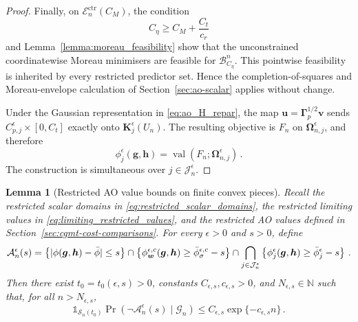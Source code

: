 \documentclass{article}
\makeatletter
\newtheorem{lemma}{Lemma}
\theoremstyle{definition}
\newcommand{\abs}[1]{%
	\ensuremath{%
		\if@display
		\left| #1 \right|
		\else
		\lvert #1 \rvert
		\fi
	}%
}
\newcommand*{\bb}{\boldsymbol}
\def\bw {\bb{w}}
\def\bu{\bb{u}}
\def\bv{\bb{v}}
\def\bh{\bb{h}}
\def\bg{\bb{g}}
\makeatother
\begin{document}
\begin{bibunit}
\begin{proof}
Finally, on $\mathcal E_n^{\mathrm{ctr}}(C_M)$, the condition
$$
    C_\eta
    \geq
    C_M+\frac{C_t}{c_r}
$$
and Lemma~\ref{lemma:moreau_feasibility} show that the unconstrained
coordinatewise Moreau minimisers are feasible for
$\mathcal B^n_{C_\eta}$. This pointwise feasibility is inherited by every
restricted predictor set. Hence the completion-of-squares and
Moreau-envelope calculation of Section~\ref{sec:ao-scalar} applies without
change.

Under the Gaussian representation in \eqref{eq:ao_H_repar}, the map
$\bu=\bb\Gamma_p^{1/2}\bv$ sends
$C_{p,j}^\epsilon\times[0,C_t]$ exactly onto
$\bb K_j^\epsilon(U_n)$. The resulting objective is $F_n$ on
$\bb\Omega_{n,j}^\epsilon$, and therefore
$$
    \phi_j^\epsilon(\bg,\bh)
    =
    \operatorname{val}
    \left(
        F_n;
        \bb\Omega_{n,j}^\epsilon
    \right)\,.
$$
The construction is simultaneous over $j\in\mathcal J_n^\epsilon$.
\end{proof}

\begin{lemma}[Restricted AO value bounds on finite convex pieces]
\label{lemma:restricted_AO_value_bounds}
Recall the restricted scalar domains in
\eqref{eq:restricted_scalar_domains}, the restricted limiting values in
\eqref{eq:limiting_restricted_values}, and the restricted AO values defined
in Section~\ref{sec:cgmt-cost-comparisons}. For every $\epsilon>0$ and
$s>0$, define
$$
\begin{aligned}
    \mathcal A_n^{\epsilon}(s)
    =
    \left\{
        \abs{\phi(\bg,\bh)-\bar\phi}\leq s
    \right\}
    \cap
    \left\{
        \phi_{\bw}^{\epsilon,c}(\bg,\bh)
        \geq
        \bar\phi_{\sigma}^{\epsilon,c}-s
    \right\}
    \cap
    \bigcap_{j\in\mathcal J_n^\epsilon}
    \left\{
        \phi_j^\epsilon(\bg,\bh)
        \geq
        \bar\phi_j^\epsilon-s
    \right\} \,.
\end{aligned}
$$
Then there exist $t_0=t_0(\epsilon,s)>0$, constants
	$C_{\epsilon,s},c_{\epsilon,s}>0$, and
	$N_{\epsilon,s}\in\mathbb N$ such that, for all
	$n>N_{\epsilon,s}$,
	$$
		\mathds{1}_{\mathcal S_n(t_0)}
		\Pr\left(
			\lnot\mathcal A_n^{\epsilon}(s)
			\mid
			\mathcal G_n
		\right)
		\leq
		C_{\epsilon,s}\exp\{-c_{\epsilon,s}n\}\,.
	$$
\end{lemma}


\end{bibunit}
\end{document}
